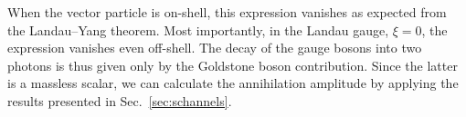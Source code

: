 %
When the vector particle is on-shell, this expression vanishes as expected from the Landau--Yang theorem. Most importantly, in the Landau gauge, $\xi=0$, the expression vanishes even off-shell.  
The decay of the gauge bosons into two photons is thus given only by the Goldstone boson contribution. Since the latter is a massless scalar, we can calculate the annihilation amplitude by applying the results presented in Sec.~\ref{sec:schannels}. 















